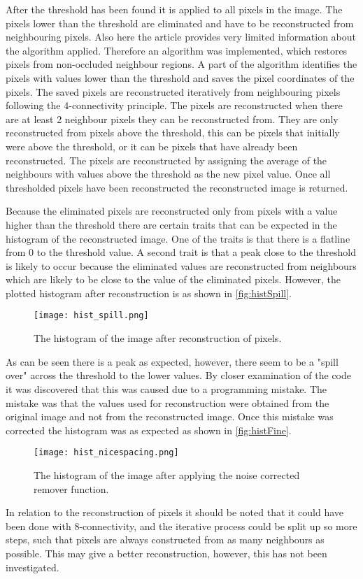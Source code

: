 After the threshold has been found it is applied to all pixels in the image. The pixels lower than the threshold are eliminated and have to be reconstructed from neighbouring pixels. Also here the article provides very limited information about the algorithm applied. Therefore an algorithm was implemented, which restores pixels from non-occluded neighbour regions. A part of the algorithm identifies the pixels with values lower than the threshold and saves the pixel coordinates of the pixels. The saved pixels are  reconstructed iteratively from neighbouring pixels following the 4-connectivity principle. The pixels are reconstructed when there are at least 2 neighbour pixels they can be reconstructed from. They are only reconstructed from pixels above the threshold, this can be pixels that initially were above the threshold, or it can be pixels that have already been reconstructed. The pixels are reconstructed by assigning the average of the neighbours with values above the threshold as the new pixel value. Once all thresholded pixels have been reconstructed the reconstructed image is returned.

Because the eliminated pixels are reconstructed only from pixels with a value higher than the threshold there are certain traits that can be expected in the histogram of the reconstructed image. One of the traits is that there is a flatline from 0 to the threshold value. A second trait is that a peak close to the threshold is likely to occur because the eliminated values are reconstructed from neighbours which are likely to be close to the value of the eliminated pixels. However, the plotted histogram after reconstruction is as shown in \autoref{fig:histSpill}.
\begin{figure}[h]
\centering
\texttt{[image: hist\_spill.png]}
\caption{The histogram of the image after reconstruction of pixels.}
\label{fig:histSpill}
\end{figure}
As can be seen there is a peak as expected, however, there seem to be a "spill over" across the threshold to the lower values. By closer examination of the code it was discovered that this was caused due to a programming mistake. The mistake was that the values used for reconstruction were obtained from the original image and not from the reconstructed image. Once this mistake was corrected the histogram was as expected as shown in \autoref{fig:histFine}. 
\begin{figure}[h]
\centering
\texttt{[image: hist\_nicespacing.png]}
\caption{The histogram of the image after applying the noise corrected remover function.}
\label{fig:histFine}
\end{figure}
In relation to the reconstruction of pixels it should be noted that it could have been done with 8-connectivity, and the iterative process could be split up so more steps, such that pixels are always constructed from as many neighbours as possible. This may give a better reconstruction, however, this has not been investigated. 

